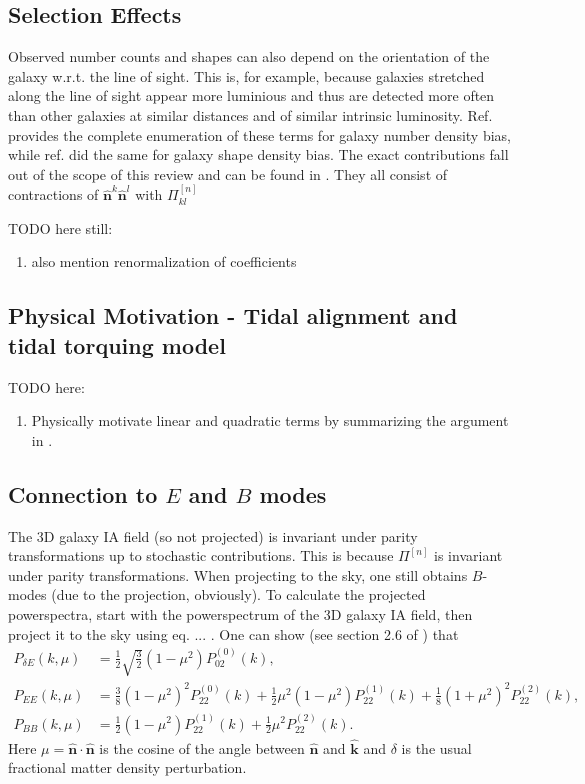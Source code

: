 \documentclass[11pt]{article}
\begin{document}
\subsection{Selection Effects}
Observed number counts and shapes can also depend on the orientation of the galaxy w.r.t. the line of sight. This is, for example, because galaxies stretched along the line of sight appear more luminious and thus are detected more often than other galaxies at similar distances and of similar intrinsic luminosity. Ref. \cite{Desjacques_2018_2} %
provides the complete enumeration of these terms for galaxy number density bias, while ref. \cite{Vlah_2020} did the same for galaxy shape density bias. The exact contributions fall out of the scope of this review and can be found in \cite{Vlah_2020}. They all consist of contractions of $\hat {\mathbf n}^k\hat {\mathbf n}^l$ with $\Pi^{[n]}_{kl}$

TODO here still:
\begin{enumerate}
    \item also mention renormalization of coefficients
\end{enumerate}

\subsection{Physical Motivation - Tidal alignment and tidal torquing model}
TODO here:
\begin{enumerate}
    \item Physically motivate linear and quadratic terms by summarizing the argument in \cite{Chisari_2013}.
\end{enumerate}

\subsection{Connection to $E$ and $B$ modes}
The 3D galaxy IA field (so not projected) is invariant under parity transformations up to stochastic contributions. This is because $\Pi^{[n]}$ is invariant under parity transformations. When projecting to the sky, one still obtains $B$-modes (due to the projection, obviously). 
To calculate the projected powerspectra, start with the powerspectrum of the 3D galaxy IA field, %
then project it to the sky using eq. ... . One can show (see section 2.6 of \cite{bakx2023effectivefieldtheoryintrinsic}) that
\begin{align}
    P_{\delta E}(k,\mu) &= \frac{1}{2}\sqrt{\frac{3}{2}}(1-\mu^2)P_{02}^{(0)}(k), \\
    P_{EE}(k, \mu) &= \frac{3}{8}(1-\mu^2)^2P_{22}^{(0)}(k) + \frac{1}{2}\mu^2(1-\mu^2)P_{22}^{(1)}(k)+\frac{1}{8}(1+\mu^2)^2P_{22}^{(2)}(k), \\
    P_{BB}(k, \mu) &= \frac{1}{2}(1-\mu^2)P_{22}^{(1)}(k)+\frac{1}{2}\mu^2P_{22}^{(2)}(k).
\end{align}
Here $\mu = \hat{\mathbf n} \cdot \hat{\mathbf n}$ is the cosine of the angle between $\hat{\mathbf n}$ and $\hat{\mathbf k}$ and $\delta$ is the usual fractional matter density perturbation.
\end{document}
